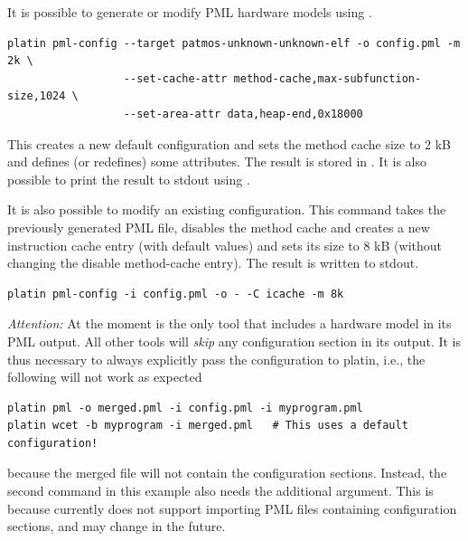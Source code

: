 It is possible to generate or modify PML hardware models using .

\begin{verbatim}
platin pml-config --target patmos-unknown-unknown-elf -o config.pml -m 2k \
                  --set-cache-attr method-cache,max-subfunction-size,1024 \
                  --set-area-attr data,heap-end,0x18000
\end{verbatim}

This creates a new default configuration and sets the method cache size to 2 kB and defines (or redefines) some
attributes. The result is stored in . It is also possible to print the result to stdout using 
\code{-o -}.

It is also possible to modify an existing configuration. This command takes the previously generated PML file,
disables the method cache and creates a new instruction cache entry (with default values) and sets its size to 8 kB
(without changing the disable method-cache entry). The result is written to stdout.

\begin{verbatim}
platin pml-config -i config.pml -o - -C icache -m 8k
\end{verbatim}

\emph{Attention:} At the moment  is the only tool that includes a hardware model in its PML output.
All other tools will \emph{skip} any configuration section in its output. It is thus necessary to always explicitly pass
the configuration to platin, i.e., the following will not work as expected

\begin{verbatim}
platin pml -o merged.pml -i config.pml -i myprogram.pml
platin wcet -b myprogram -i merged.pml   # This uses a default configuration!
\end{verbatim}

because the merged file will not contain the configuration sections. Instead, the second command in this example also
needs the additional  argument. This is because  currently does
not support importing PML files containing configuration sections, and may change in the future.


